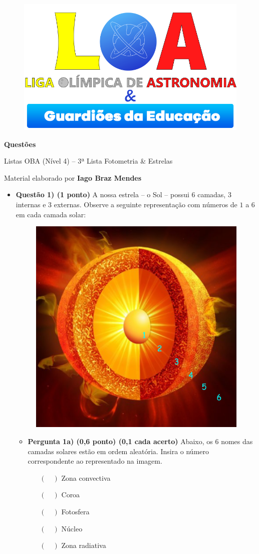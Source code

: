 \documentclass[a4paper, 12pt]{article}
\newcommand{\cabecalho}[4]
{
	\begin{figure}
		\centering
		\href{https://ligaolimpicadeastronomia.com.br/}{\includegraphics[scale=0.6]{./img/logos.png}}
	\end{figure}
	
	\begin{center}
		\begin{large}
			\textbf{#1}	
		\end{large}
			\linebreak Listas OBA (Nível 4) -- #2ª Lista
			\linebreak #3
		\end{center}
	
	\begin{flushright}
		Material elaborado por \textbf{#4}
	\end{flushright}
}
\begin{document}
	\cabecalho{Questões}{3}{Fotometria \& Estrelas}{Iago Braz Mendes}
	
	\begin{flushleft}
	\begin{itemize}
		\item \textbf{Questão 1) (1 ponto)} A nossa estrela -- o Sol -- possui 6 camadas, 3 internas e 3 externas. Observe a seguinte representação com números de $1$ a $6$ em cada camada solar:
			\begin{figure}[H]
				\centering
				\includegraphics[scale=0.6]{./img/1.png}
			\end{figure}
			\begin{itemize}
				\item \textbf{Pergunta 1a) (0,6 ponto) (0,1 cada acerto)} Abaixo, os 6 nomes das camadas solares estão em ordem aleatória. Insira o número correspondente ao representado na imagem.
					\begin{multicols}{2} \begin{itemize}
						\item[$(\quad)$] Zona convectiva
						\item[$(\quad)$] Coroa
						\item[$(\quad)$] Fotosfera
						\item[$(\quad)$] Núcleo
						\item[$(\quad)$] Zona radiativa

\end{itemize}
\end{multicols}
\end{itemize}
\end{itemize}
\end{flushleft}
\end{document}
